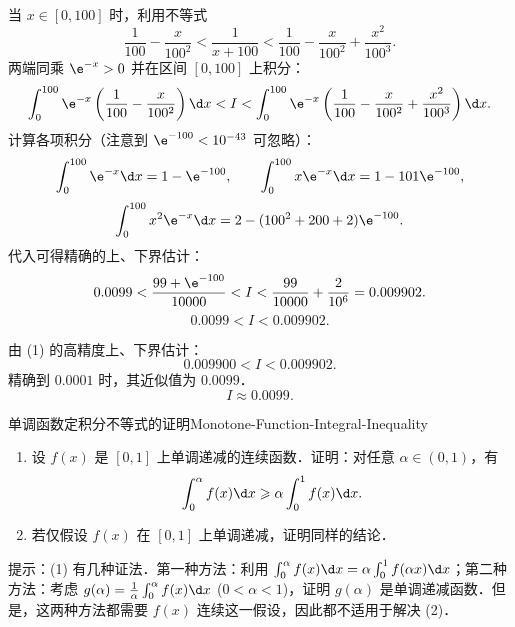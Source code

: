 \begin{solution}

    当 $x \in [0, 100]$ 时，利用不等式
    \begin{equation}
        \frac{1}{100} - \frac{x}{100^2} < \frac{1}{x + 100} < \frac{1}{100} - \frac{x}{100^2} + \frac{x^2}{100^3}.
    \end{equation}
    两端同乘 $\e^{-x} > 0$ 并在区间 $[0, 100]$ 上积分：
    \begin{equation}
        \int_0^{100} \e^{-x}\left( \frac{1}{100} - \frac{x}{100^2} \right) \d x < I < \int_0^{100} \e^{-x}\left( \frac{1}{100} - \frac{x}{100^2} + \frac{x^2}{100^3} \right) \d x.
    \end{equation}
    计算各项积分（注意到 $\e^{-100} < 10^{-43}$ 可忽略）：
    \begin{equation}
        \int_0^{100} \e^{-x} \d x = 1 - \e^{-100}, \qquad \int_0^{100} x\e^{-x} \d x = 1 - 101\e^{-100},
    \end{equation}
    \begin{equation}
        \int_0^{100} x^2\e^{-x} \d x = 2 - (100^2 + 200 + 2)\e^{-100}.
    \end{equation}
    代入可得精确的上、下界估计：
    \begin{equation}
        0.0099 < \frac{99 + \e^{-100}}{10000} < I < \frac{99}{10000} + \frac{2}{10^6} = 0.009902.
    \end{equation}
    \begin{equation}
        \boxed{0.0099 < I < 0.009902.}
    \end{equation}


    由 (1) 的高精度上、下界估计：
    \begin{equation}
        0.009900 < I < 0.009902.
    \end{equation}
    精确到 $0.0001$ 时，其近似值为 $0.0099$．
    \begin{equation}
        \boxed{I \approx 0.0099.}
    \end{equation}
\end{solution}

\begin{problem}{单调函数定积分不等式的证明}{Monotone-Function-Integral-Inequality}
    \begin{enumerate}
        \item 设 $f(x)$ 是 $[0, 1]$ 上单调递减的连续函数．证明：对任意 $\alpha \in (0, 1)$，有
              \begin{equation}
                  \int_0^\alpha f(x) \d x \geqslant \alpha \int_0^1 f(x) \d x.
              \end{equation}
        \item 若仅假设 $f(x)$ 在 $[0, 1]$ 上单调递减，证明同样的结论．
    \end{enumerate}
    提示：(1) 有几种证法．第一种方法：利用 $\int_0^\alpha f(x) \d x = \alpha \int_0^1 f(\alpha x) \d x$；第二种方法：考虑 $g(\alpha) = \frac{1}{\alpha}\int_0^\alpha f(x) \d x$ ($0 < \alpha < 1$)，证明 $g(\alpha)$ 是单调递减函数．但是，这两种方法都需要 $f(x)$ 连续这一假设，因此都不适用于解决 (2)．
\end{problem}

